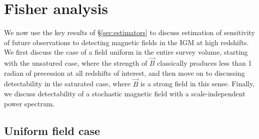\section{Fisher analysis}
\label{sec:fisher}

We now use the key results of \S\ref{sec:estimators} to discuss estimation of sensitivity of future observations to detecting magnetic fields in the IGM at high redshifts. We first discuss the case of a field uniform in the entire survey volume, starting with the unsatured case, where the strength of $\vec B$ classically produces less than 1 radian of precession at all redshifts of interest, and then move on to discussing detectability in the saturated case, where $\vec B$ is a strong field in this sense. Finally, we discuss detectability of a stochastic magnetic field with a scale-independent power spectrum.

\subsection{Uniform field case}
\label{subsec:uniform_fisher}

